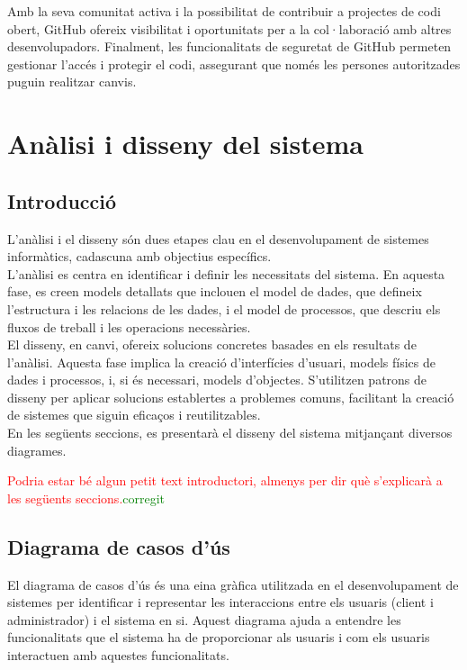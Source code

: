 \documentclass[a4paper,12pt,twoside]{ThesisStyle}
\newcommand{\pau}[1]{\textcolor{red}{#1}}
\newcommand{\sudan}[1]{\textcolor{green}{#1}}
\begin{document}
Amb la seva comunitat activa i la possibilitat de contribuir a projectes de codi obert, GitHub ofereix visibilitat i oportunitats per a la col·laboració amb altres desenvolupadors. Finalment, les funcionalitats de seguretat de GitHub permeten gestionar l'accés i protegir el codi, assegurant que només les persones autoritzades puguin realitzar canvis.


\chapter{Anàlisi i disseny del sistema}
\label{chp:analisi}


\section{Introducció}
\label{sec: Introducció}
L'anàlisi i el disseny són dues etapes clau en el desenvolupament de sistemes informàtics, cadascuna amb objectius específics.\\

L'anàlisi es centra en identificar i definir les necessitats del sistema. En aquesta fase, es creen models detallats que inclouen el model de dades, que defineix l'estructura i les relacions de les dades, i el model de processos, que descriu els fluxos de treball i les operacions necessàries.\\

El disseny, en canvi, ofereix solucions concretes basades en els resultats de l'anàlisi. Aquesta fase implica la creació d'interfícies d'usuari, models físics de dades i processos, i, si és necessari, models d'objectes. S'utilitzen patrons de disseny per aplicar solucions establertes a problemes comuns, facilitant la creació de sistemes que siguin eficaços i reutilitzables.\\

En les següents seccions, es presentarà el disseny del sistema mitjançant diversos diagrames.


\pau{Podria estar bé algun petit text introductori, almenys per dir què s'explicarà a les següents seccions.}\sudan{corregit}


\section{Diagrama de casos d'ús}
\label{sec: Diagrama de casos d'ús}

El diagrama de casos d'ús és una eina gràfica utilitzada en el desenvolupament de sistemes per identificar i representar les interaccions entre els usuaris (client i administrador) i el sistema en si. Aquest diagrama ajuda a entendre les funcionalitats que el sistema ha de proporcionar als usuaris i com els usuaris interactuen amb aquestes funcionalitats.
\end{document}
